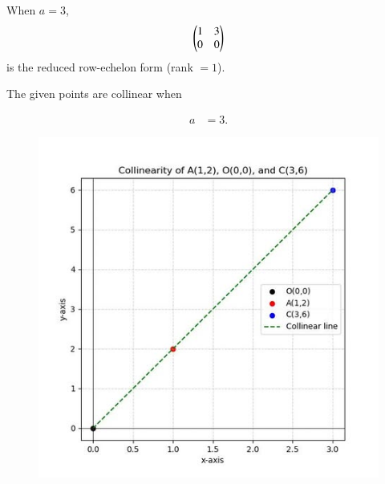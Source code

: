 \documentclass[journal]{IEEEtran}
\begin{document}
When $a=3$,
\[
\begin{pmatrix}1 & 3 \\ 0 & 0\end{pmatrix}
\]
is the reduced row-echelon form (rank $=1$).




The given points are collinear when

\begin{align}
a &= 3.
\end{align}

\begin{figure}[H]
    \centering
    \includegraphics[scale=0.6]{figs/1.7.2.jpg}
    \caption{}
    \label{fig:1}
\end{figure}
\end{document}
